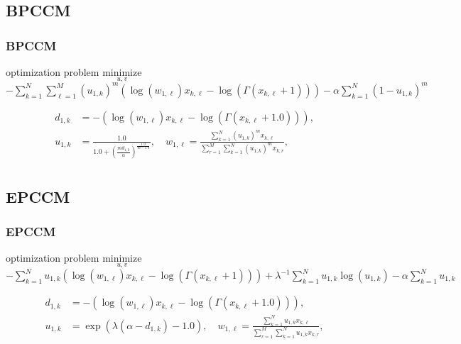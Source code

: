 \documentclass[fleqn,dvipdfmx,10pt]{beamer}
\begin{document}
\subsection{BPCCM}
\begin{frame}\frametitle{BPCCM}
  \begin{block}{optimization problem}
    $\underset{u,v}{\text{minimize}}$
    $-\sum_{k=1}^N\sum_{\ell=1}^M(u_{1,k})^m\left(\log(w_{1,\ell})x_{k,\ell}-\log(\Gamma(x_{k,\ell}+1))\right)-\alpha\sum_{k=1}^N(1-u_{1,k})^m$ \centering\\
  \end{block}
  \begin{center}
    \begin{align*}
      d_{1,k}&=-\left(\log(w_{1,\ell})x_{k,\ell}-\log(\Gamma(x_{k,\ell}+1.0))\right),\\
      u_{1,k}&=\frac{1.0}{1.0+\left(\frac{md_{1,k}}{\alpha}\right)^{\frac{1.0}{m-1.0}}},\quad
      w_{1,\ell}=\frac{\sum_{k=1}^N (u_{1,k})^m x_{k,\ell}}{\sum_{r=1}^M \sum_{k=1}^N (u_{1,k})^m x_{k,r}},\\
    \end{align*}
  \end{center}
\end{frame}

\subsection{EPCCM}
\begin{frame}\frametitle{EPCCM}
  \begin{block}{optimization problem}
    $\underset{u,v}{\text{minimize}}$
    $-\sum_{k=1}^Nu_{1,k}\left(\log(w_{1,\ell})x_{k,\ell}-\log(\Gamma(x_{k,\ell}+1))\right)+\lambda^{-1}\sum_{k=1}^Nu_{1,k}\log(u_{1,k})-\alpha\sum_{k=1}^Nu_{1,k}$\centering\\
  \end{block}
  \begin{align*}
    d_{1,k}&=-\left(\log(w_{1,\ell})x_{k,\ell}-\log(\Gamma(x_{k,\ell}+1.0))\right),\\
    u_{1,k}&=\exp(\lambda(\alpha-d_{1,k})-1.0),\quad
    w_{1,\ell}=\frac{\sum_{k=1}^N u_{1,k}x_{k,\ell}}{\sum_{r=1}^M\sum_{k=1}^N u_{1,k}x_{k,r}},\\
  \end{align*}
\end{frame}
\end{document}
